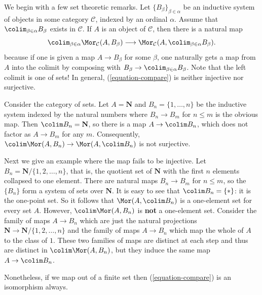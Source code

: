 \medskip\noindent
We begin with a few set theoretic remarks.
Let $\{B_{\beta}\}_{\beta \in \alpha}$ be an inductive system of
objects in some category $\mathcal{C}$, indexed by
an ordinal $\alpha$. Assume that $\colim_{\beta \in \alpha} B_\beta$
exists in $\mathcal{C}$. If $A$ is an object of $\mathcal{C}$, then there is a
natural map
\begin{equation}
\label{equation-compare}
\colim_{\beta \in \alpha} \Mor_\mathcal{C}(A, B_\beta)
\longrightarrow
\Mor_\mathcal{C}(A, \colim_{\beta \in \alpha} B_\beta).
\end{equation}
because if one is given a map $A \to B_\beta$ for some $\beta$, one
naturally gets a map from $A$  into the colimit by composing with
$B_\beta \to \colim_{\beta \in \alpha} B_\beta$.
Note that the left colimit is one of sets! In general, (\ref{equation-compare})
is neither injective nor surjective.

\begin{example}
\label{example-not-surjective}
Consider the category of sets. Let $A = \mathbf{N}$ and
$B_n = \{1, \ldots, n\}$ be the inductive system indexed by the natural numbers
where $B_n \to B_m$ for $n \leq m$ is the obvious map. Then
$\colim B_n = \mathbf{N}$, so there is a map
$A \to \colim B_n$, which does not factor as $A \to B_m$
for any $m$. Consequently,
$\colim \Mor(A, B_n) \to \Mor(A, \colim B_n)$
is not surjective.
\end{example}

\begin{example}
\label{example-not-injective}
Next we give an example where the map fails to be injective. Let $B_n =
\mathbf{N}/\{1,  2, \ldots, n\}$, that is, the quotient set of
$\mathbf{N}$ with the first $n$ elements collapsed to one element.
There are natural maps $B_n \to B_m$ for $n \leq m$, so the
$\{B_n\}$ form a system of sets over $\mathbf{N}$. It is easy to see that
$\colim B_n = \{*\}$: it is the one-point set.
So it follows that $\Mor(A, \colim B_n)$ is a one-element set
for every set $A$.
However, $\colim \Mor(A , B_n)$ is {\bf not} a one-element set.
Consider the family of maps $A \to B_n$ which are just the natural projections
$\mathbf{N} \to \mathbf{N}/\{1, 2, \ldots, n\}$ and the family of
maps $A \to B_n$ which map the whole of $A$ to the class of $1$.
These two families of maps are distinct at each step and thus are distinct in
$\colim \Mor(A, B_n)$, but they induce the same map
$A \to \colim B_n$.
\end{example}

\noindent
Nonetheless, if we map out of a finite set then
(\ref{equation-compare}) is an isomorphism always.

